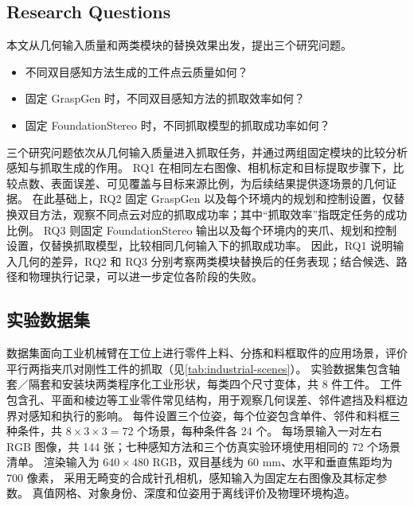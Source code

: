 \documentclass[UTF8,fontset=fandol,a4paper,11pt]{ctexart}
\newcommand{\qyb}[1]{#1}
\newcommand{\rqone}{不同双目感知方法生成的工件点云质量如何？}
\newcommand{\rqtwo}{固定 GraspGen 时，不同双目感知方法的抓取效率如何？}
\newcommand{\rqthree}{固定 FoundationStereo 时，不同抓取模型的抓取成功率如何？}
\begin{document}
\subsection{\qyb{Research Questions}}

本文从几何输入质量和两类模块的替换效果出发，提出三个研究问题。

\begin{itemize}[leftmargin=3.2em,itemsep=.6em]
\item[RQ1.] \rqone
\item[RQ2.] \rqtwo
\item[RQ3.] \rqthree
\end{itemize}

三个研究问题依次从几何输入质量进入抓取任务，并通过两组固定模块的比较分析感知与抓取生成的作用。
RQ1 在相同左右图像、相机标定和目标提取步骤下，比较点数、表面误差、可见覆盖与目标来源比例，为后续结果提供逐场景的几何证据。
在此基础上，RQ2 固定 GraspGen 以及每个环境内的规划和控制设置，仅替换双目方法，观察不同点云对应的抓取成功率；其中“抓取效率”指既定任务的成功比例。
RQ3 则固定 FoundationStereo 输出以及每个环境内的夹爪、规划和控制设置，仅替换抓取模型，比较相同几何输入下的抓取成功率。
因此，RQ1 说明输入几何的差异，RQ2 和 RQ3 分别考察两类模块替换后的任务表现；结合候选、路径和物理执行记录，可以进一步定位各阶段的失败。

\subsection{\qyb{实验数据集}}

数据集面向工业机械臂在工位上进行零件上料、分拣和料框取件的应用场景，评价平行两指夹爪对刚性工件的抓取（见\cref{tab:industrial-scenes}）。
实验数据集包含轴套／隔套和安装块两类程序化工业形状，每类四个尺寸变体，共 8 件工件。
工件包含孔、平面和棱边等工业零件常见结构，用于观察几何误差、邻件遮挡及料框边界对感知和执行的影响。
每件设置三个位姿，每个位姿包含单件、邻件和料框三种条件，共 $8\times3\times3=72$ 个场景，每种条件各 24 个。
每场景输入一对左右 RGB 图像，共 144 张；七种感知方法和三个仿真实验环境使用相同的 72 个场景清单。
渲染输入为 $640\times480$ RGB，双目基线为 60 mm、水平和垂直焦距均为 700 像素，
采用无畸变的合成针孔相机，感知输入为固定左右图像及其标定参数。
真值网格、对象身份、深度和位姿用于离线评价及物理环境构造。
\end{document}
